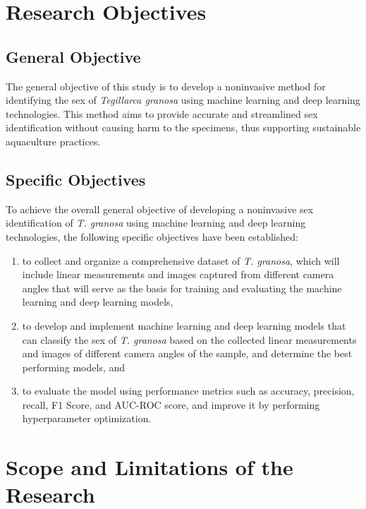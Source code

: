 \section{Research Objectives}
\label{sec:researchobjectives}

\subsection{General Objective}
\label{sec:generalobjective}

The general objective of this study is to develop a noninvasive method for identifying the sex of \textit{Tegillarca granosa} using machine learning and deep learning technologies. This method aims to provide accurate and streamlined sex identification without causing harm to the specimens, thus supporting sustainable aquaculture practices.

\subsection{Specific Objectives}
\label{sec:specificobjectives}

To achieve the overall general objective of developing a noninvasive sex identification of \textit{T. granosa} using machine learning and deep learning technologies, the following specific objectives have been established:  

\begin{enumerate}
	\item to collect and organize a comprehensive dataset of \textit{T. granosa}, which will include linear measurements and images captured from different camera angles that will serve as the basis for training and evaluating the machine learning and deep learning models,
	
	\item to develop and implement machine learning and deep learning models that can classify the sex of \textit{T. granosa} based on the collected linear measurements and images of different camera angles of the sample, and determine the best performing models, and
	
	\item to evaluate the model using performance metrics such as accuracy, precision, recall, F1 Score, and AUC-ROC score, and improve it by performing hyperparameter optimization.
	
	
\end{enumerate}

\section{Scope and Limitations of the Research}
\label{sec:scopelimitations}

